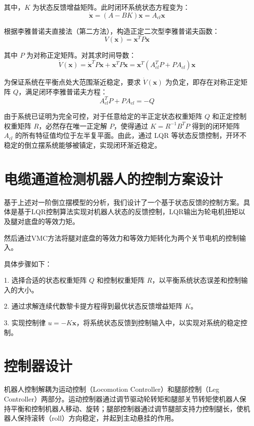 其中，$K$ 为状态反馈增益矩阵。此时闭环系统状态方程变为：
\begin{equation}
\dot{\mathbf{x}} = (A - BK)\mathbf{x} = A_{cl}\mathbf{x}
\end{equation}

根据李雅普诺夫直接法（第二方法），构造正定二次型李雅普诺夫函数：
\begin{equation}
V(\mathbf{x}) = \mathbf{x}^T P \mathbf{x}
\end{equation}

其中 $P$ 为对称正定矩阵。对其求时间导数：
\begin{equation}
\dot{V}(\mathbf{x}) = \dot{\mathbf{x}}^T P \mathbf{x} + \mathbf{x}^T P \dot{\mathbf{x}} = \mathbf{x}^T (A_{cl}^T P + P A_{cl}) \mathbf{x}
\end{equation}

为保证系统在平衡点处大范围渐近稳定，要求 $\dot{V}(\mathbf{x})$ 为负定，即存在对称正定矩阵 $Q$，满足闭环李雅普诺夫方程：
\begin{equation}
A_{cl}^T P + P A_{cl} = -Q
\end{equation}

由于系统已证明为完全可控，对于任意给定的半正定状态权重矩阵 $Q$ 和正定控制权重矩阵 $R$，必然存在唯一正定解 $P$，使得通过 $K = R^{-1}B^T P$ 得到的闭环矩阵 $A_{cl}$ 的所有特征值均位于左半复平面。由此，通过 LQR 等状态反馈控制，开环不稳定的倒立摆系统能够被镇定，实现闭环渐近稳定。

\section{电缆通道检测机器人的控制方案设计}
基于上述对一阶倒立摆模型的分析，我们设计了一个基于状态反馈的控制方案。具体是基于LQR控制算法实现对机器人状态的反馈控制，LQR输出为轮电机扭矩以及腿对底盘的等效力矩。

然后通过VMC方法将腿对底盘的等效力和等效力矩转化为两个关节电机的控制输入。

具体步骤如下：

1. 选择合适的状态权重矩阵 $Q$ 和控制权重矩阵 $R$，以平衡系统状态误差和控制输入的大小。

2. 通过求解连续代数黎卡提方程得到最优状态反馈增益矩阵 $K$。

3. 实现控制律 $u = -K\mathbf{x}$，将系统状态反馈到控制输入中，以实现对系统的稳定控制。

\section{控制器设计}
机器人控制解耦为运动控制（Locomotion Controller）和腿部控制（Leg Controller）两部分。运动控制器通过调节驱动轮转矩和腿部关节转矩使机器人保持平衡和控制机器人移动、旋转；腿部控制器通过调节腿部支持力控制腿长，使机器人保持滚转（roll）方向稳定，并起到主动悬挂的作用。

